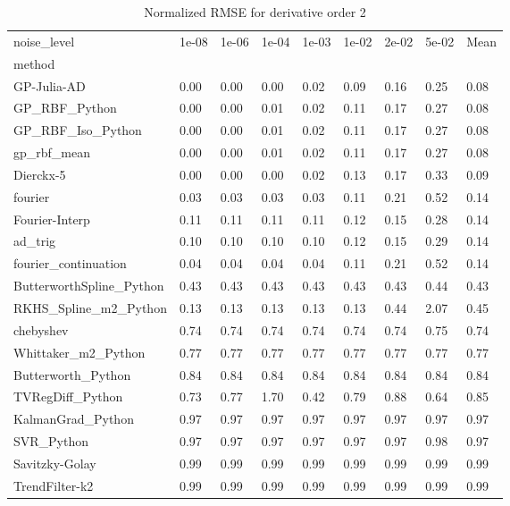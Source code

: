\begin{table}
\caption{Normalized RMSE for derivative order 2}
\label{tab:nrmse_order_2}
\begin{tabular}{lllllllll}
\toprule
noise_level & 1e-08 & 1e-06 & 1e-04 & 1e-03 & 1e-02 & 2e-02 & 5e-02 & Mean \\
method &  &  &  &  &  &  &  &  \\
\midrule
GP-Julia-AD & 0.00 & 0.00 & 0.00 & 0.02 & 0.09 & 0.16 & 0.25 & 0.08 \\
GP_RBF_Python & 0.00 & 0.00 & 0.01 & 0.02 & 0.11 & 0.17 & 0.27 & 0.08 \\
GP_RBF_Iso_Python & 0.00 & 0.00 & 0.01 & 0.02 & 0.11 & 0.17 & 0.27 & 0.08 \\
gp_rbf_mean & 0.00 & 0.00 & 0.01 & 0.02 & 0.11 & 0.17 & 0.27 & 0.08 \\
Dierckx-5 & 0.00 & 0.00 & 0.00 & 0.02 & 0.13 & 0.17 & 0.33 & 0.09 \\
fourier & 0.03 & 0.03 & 0.03 & 0.03 & 0.11 & 0.21 & 0.52 & 0.14 \\
Fourier-Interp & 0.11 & 0.11 & 0.11 & 0.11 & 0.12 & 0.15 & 0.28 & 0.14 \\
ad_trig & 0.10 & 0.10 & 0.10 & 0.10 & 0.12 & 0.15 & 0.29 & 0.14 \\
fourier_continuation & 0.04 & 0.04 & 0.04 & 0.04 & 0.11 & 0.21 & 0.52 & 0.14 \\
ButterworthSpline_Python & 0.43 & 0.43 & 0.43 & 0.43 & 0.43 & 0.43 & 0.44 & 0.43 \\
RKHS_Spline_m2_Python & 0.13 & 0.13 & 0.13 & 0.13 & 0.13 & 0.44 & 2.07 & 0.45 \\
chebyshev & 0.74 & 0.74 & 0.74 & 0.74 & 0.74 & 0.74 & 0.75 & 0.74 \\
Whittaker_m2_Python & 0.77 & 0.77 & 0.77 & 0.77 & 0.77 & 0.77 & 0.77 & 0.77 \\
Butterworth_Python & 0.84 & 0.84 & 0.84 & 0.84 & 0.84 & 0.84 & 0.84 & 0.84 \\
TVRegDiff_Python & 0.73 & 0.77 & 1.70 & 0.42 & 0.79 & 0.88 & 0.64 & 0.85 \\
KalmanGrad_Python & 0.97 & 0.97 & 0.97 & 0.97 & 0.97 & 0.97 & 0.97 & 0.97 \\
SVR_Python & 0.97 & 0.97 & 0.97 & 0.97 & 0.97 & 0.97 & 0.98 & 0.97 \\
Savitzky-Golay & 0.99 & 0.99 & 0.99 & 0.99 & 0.99 & 0.99 & 0.99 & 0.99 \\
TrendFilter-k2 & 0.99 & 0.99 & 0.99 & 0.99 & 0.99 & 0.99 & 0.99 & 0.99 \\

\end{tabular}
\end{table}
